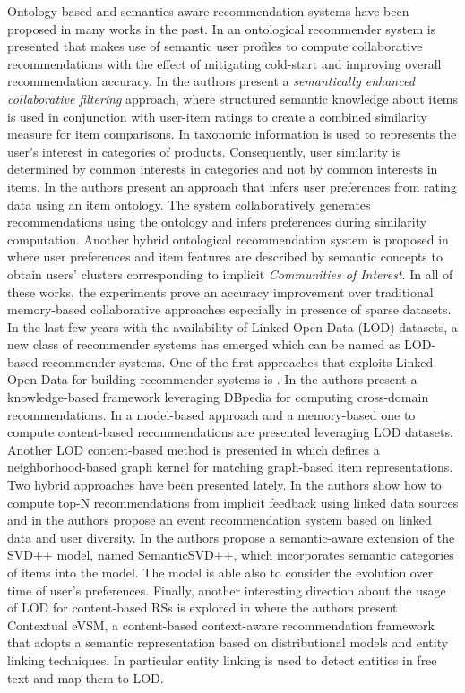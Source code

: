 Ontology-based and semantics-aware recommendation systems have been proposed in many works in the past. 
In \citep{Middleton_2009} an ontological recommender system is presented that makes use of semantic user profiles to compute collaborative recommendations with the effect of mitigating cold-start and improving overall recommendation accuracy. 
In \citep{mobasher2004} the authors present a \textit{semantically enhanced collaborative filtering} approach, where structured semantic knowledge about items is used in conjunction with user-item ratings to create a combined similarity measure for item comparisons. 
In \citep{Ziegler2004} taxonomic information is used to represents the user's interest in categories of products. Consequently, user similarity is determined by common interests in categories and not by common interests in items. 
In \citep{Anand2007} the authors present an approach that infers user preferences from rating data using an item ontology. The system collaboratively generates recommendations using the ontology and infers preferences during similarity computation. 
Another hybrid ontological recommendation system is proposed in \citep{Cantador08amultilayer} where user preferences and item features are described by semantic concepts to obtain users' clusters corresponding to implicit \textit{Communities of Interest}.
In all of these works, the experiments prove an accuracy improvement over traditional memory-based collaborative approaches especially in presence of sparse datasets. 
In the last few years with the availability of Linked Open Data (LOD) datasets, a new class of recommender systems has emerged which can be named as LOD-based recommender systems. 
One of the first approaches that exploits Linked Open Data for building recommender systems is \citep{HeitmannH10}. 
In \citep{Fernandez-Tobias2011} the authors present a knowledge-based framework leveraging DBpedia for computing cross-domain recommendations. 
In \citep{DMOR12,DMORZ12} a model-based approach and a memory-based one to compute content-based recommendations are presented leveraging LOD datasets. Another LOD content-based method is presented in \citep{ODMD14a} which defines a neighborhood-based graph kernel for matching graph-based item representations. 
Two hybrid approaches have been presented lately. In \citep{Ostuni2013} the authors show how to compute top-N recommendations from implicit feedback using linked data sources and in \citep{Khrouf2013} the authors propose an event recommendation system based on linked data and user diversity. 
In \citep{Rowe1} the authors propose a semantic-aware extension of the SVD++ model, named SemanticSVD++, which incorporates semantic categories of items into the model. The model is able also to consider the evolution over time of user's preferences. 
Finally, another interesting direction about the usage of LOD for content-based RSs is explored in \citep{MustoSLG14} where the authors present Contextual eVSM, a content-based context-aware recommendation framework that adopts a semantic representation based on distributional models and entity linking techniques. In particular entity linking is used to detect entities in free text and map them to LOD.


